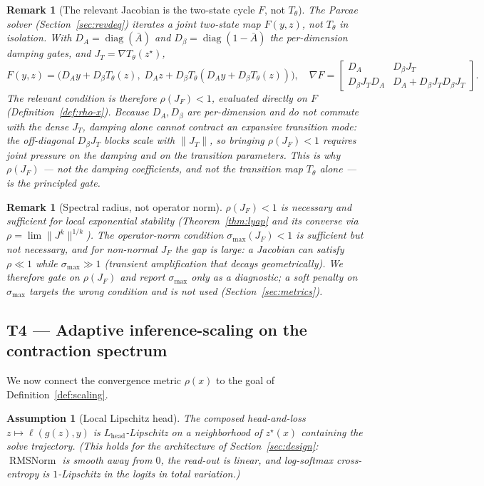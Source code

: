 \documentclass[11pt]{article}
\newtheorem{remark}[theorem]{Remark}
\newtheorem{assumption}[theorem]{Assumption}
\newcommand{\RMSNorm}{\operatorname{RMSNorm}}
\newcommand{\diag}{\operatorname{diag}}
\newcommand{\rhoF}{\rho(J_F)}
\begin{document}
\begin{remark}[The relevant Jacobian is the two-state cycle $F$, not $T_\theta$]
\label{rem:F}
The Parcae solver (Section~\ref{sec:revdeq}) iterates a \emph{joint two-state} map
$F(y,z)$, not $T_\theta$ in isolation.  With $D_A=\diag(\bar A)$ and
$D_\beta=\diag(1-\bar A)$ the per-dimension damping gates, and $J_T=\nabla T_\theta(z^\star)$,
\[
  F(y,z)=\bigl(D_A y + D_\beta T_\theta(z),\; D_A z + D_\beta T_\theta(D_A y + D_\beta T_\theta(z))\bigr),
  \quad
  \nabla F=\begin{bmatrix} D_A & D_\beta J_T \\ D_\beta J_T D_A & D_A + D_\beta J_T D_\beta J_T \end{bmatrix}.
\]
The relevant condition is therefore $\rhoF<1$, evaluated directly on $F$
(Definition~\ref{def:rho-x}).  Because $D_A,D_\beta$ are per-dimension and do not commute
with the dense $J_T$, damping alone cannot contract an expansive transition mode: the
off-diagonal $D_\beta J_T$ blocks scale with $\|J_T\|$, so bringing $\rhoF<1$ requires
\emph{joint} pressure on the damping \emph{and} on the transition parameters.  This is why
$\rhoF$ --- not the damping coefficients, and not the transition map $T_\theta$ alone --- is
the principled gate.
\end{remark}

\begin{remark}[Spectral radius, not operator norm]
\label{rem:rho-vs-sigma}
$\rhoF<1$ is \emph{necessary and sufficient} for local exponential stability
(Theorem~\ref{thm:lyap} and its converse via $\rho=\lim\|J^k\|^{1/k}$).  The operator-norm
condition $\sigma_{\max}(J_F)<1$ is \emph{sufficient but not necessary}, and for
non-normal $J_F$ the gap is large: a Jacobian can satisfy $\rho\ll1$ while $\sigma_{\max}\gg1$
(transient amplification that decays geometrically).  We therefore gate on $\rhoF$ and report
$\sigma_{\max}$ only as a diagnostic; a soft penalty on $\sigma_{\max}$ targets the wrong
condition and is not used (Section~\ref{sec:metrics}).
\end{remark}

\subsection{T4 --- Adaptive inference-scaling on the contraction spectrum}
\label{sec:t4}

We now connect the convergence metric $\rho(x)$ to the goal of
Definition~\ref{def:scaling}.

\begin{assumption}[Local Lipschitz head]
\label{ass:lip}
The composed head-and-loss $z\mapsto \ell(g(z),y)$ is $L_{\mathrm{head}}$-Lipschitz on a
neighborhood of $z^\star(x)$ containing the solve trajectory.  (This holds for the
architecture of Section~\ref{sec:design}: $\RMSNorm$ is smooth away from $0$, the read-out
is linear, and log-softmax cross-entropy is $1$-Lipschitz in the logits in total variation.)
\end{assumption}
\end{document}
